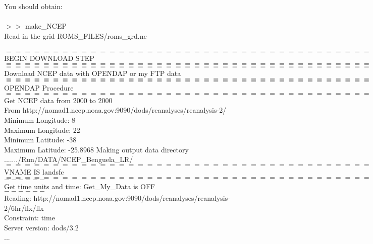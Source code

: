You should obtain:
\\\\
$>>$ make\_NCEP\\
Read in the grid ROMS\_FILES/roms\_grd.nc \\
\\ 
$===========================================$ \\
BEGIN DOWNLOAD STEP   \\
$===========================================$ \\
$===========================================$ \\
Download NCEP data with OPENDAP or my FTP data \\
$===========================================$ \\
$===========================================$ \\
OPENDAP Procedure \\
$===========================================$ \\
 
\noindent Get NCEP data from 2000 to 2000 \\
From http://nomad1.ncep.noaa.gov:9090/dods/reanalyses/reanalysis-2/ \\

\noindent Minimum Longitude: 8 \\
Maximum Longitude: 22 \\
Minimum Latitude: -38 \\
Maximum Latitude: -25.8968
\noindent Making output data directory \\
......./Run/DATA/NCEP\_Benguela\_LR/ \\
$=========================================$ \\
VNAME IS landsfc \\
$=========================================$ \\
$------$ \\
Get time units and time:  Get\_My\_Data is OFF  \\
$------$ \\
Reading: http://nomad1.ncep.noaa.gov:9090/dods/reanalyses/reanalysis-2/6hr/flx/flx \\
  Constraint: time \\
Server version: dods/3.2\\
...


